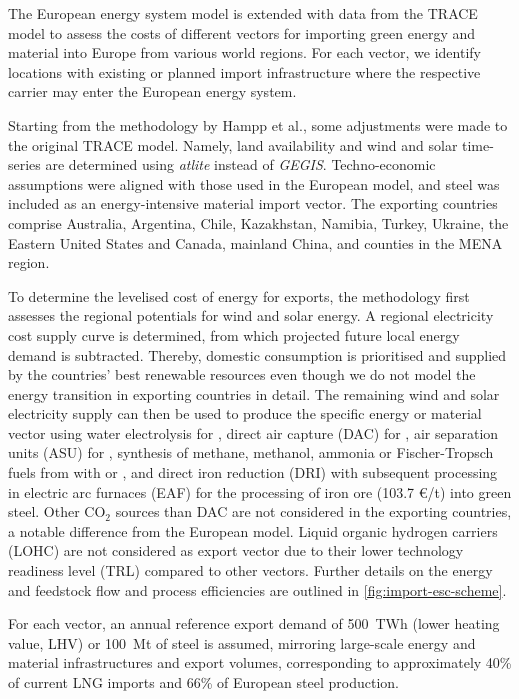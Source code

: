 The European energy system model is extended with data from the TRACE model
\cite{hamppImportOptions2023} to assess the costs of different vectors for
importing green energy and material into Europe from various world regions. For
each vector, we identify locations with existing or planned import
infrastructure where the respective carrier may enter the European energy
system.

Starting from the methodology by Hampp et al.\cite{hamppImportOptions2023}, some
adjustments were made to the original TRACE model. Namely, land availability and
wind and solar time-series are determined using
\textit{atlite}\cite{hofmannAtliteLightweight2021} instead of
\textit{GEGIS}.\cite{mattssonAutopilotEnergy2021} Techno-economic assumptions
were aligned with those used in the European model, and steel was included as an
energy-intensive material import vector. The exporting countries comprise
Australia, Argentina, Chile, Kazakhstan, Namibia, Turkey, Ukraine, the Eastern
United States and Canada, mainland China, and counties in the MENA region.

To determine the levelised cost of energy for exports, the methodology first
assesses the regional potentials for wind and solar energy. A regional
electricity cost supply curve is determined, from which projected future local
energy demand is subtracted. Thereby, domestic consumption is prioritised and
supplied by the countries' best renewable resources even though we do not model
the energy transition in exporting countries in detail. The remaining wind and
solar electricity supply can then be used to produce the specific energy or
material vector using water electrolysis for , direct air capture (DAC)
for , air separation units (ASU) for , synthesis of methane,
methanol, ammonia or Fischer-Tropsch fuels from  with  or
, and  direct iron reduction (DRI) with subsequent processing in
electric arc furnaces (EAF) for the processing of iron ore (103.7 \euro{}/t)
into green steel. Other CO$_2$ sources than DAC are not considered in the
exporting countries, a notable difference from the European model. Liquid
organic hydrogen carriers (LOHC) are not considered as export vector due to
their lower technology readiness level (TRL) compared to other
vectors.\cite{irenaGlobalHydrogen2022} Further details on the energy and
feedstock flow and process efficiencies are outlined in
\cref{fig:import-esc-scheme}.

For each vector, an annual reference export demand of 500~TWh (lower heating
value, LHV) or 100~Mt of steel is assumed, mirroring large-scale energy and
material infrastructures and export volumes, corresponding to approximately 40\%
of current LNG
imports\cite{instituteforenergyeconomicsandfinancialanalysisEuropeanLNG2023} and
66\% of European steel
production.\cite{eurofer-theeuropeansteelassociationEuropeanSteel2023}

